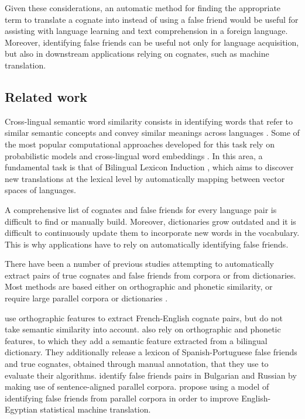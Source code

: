 \documentclass[output=paper]{langsci/langscibook}
\begin{document}
Given these considerations, an automatic method for finding the appropriate term to translate a cognate into instead of using a false friend would be useful for assisting with language learning and text comprehension in a foreign language.
Moreover, identifying false friends can be useful not only for language acquisition, but also in downstream applications relying on cognates, such as machine translation.

\subsection{Related work}

Cross-lingual semantic word similarity consists in identifying words that refer to similar semantic concepts and convey similar meanings across languages \citep{cognatesuban:vulic_and_moens_2}. Some of the most popular computational approaches developed for this task rely on probabilistic models \citep{cognatesuban:vulic_and_moens} and cross-lingual word embeddings \citep{cognatesuban:soegard_et_al}. In this area, a fundamental task is that of Bilingual Lexicon Induction \citep{cognatesuban:mikolov2013exploiting,cognatesuban:heyman2017bilingual,cognatesuban:vulic-moens-2015-bilingual}, which aims to discover new translations at the lexical level by automatically mapping between vector spaces of languages.

A comprehensive list of cognates and false friends for every language pair is difficult to find or manually build. Moreover, dictionaries grow outdated and it is difficult to continuously update them to incorporate new words in the vocabulary. This is why applications have to rely on automatically identifying false friends.

There have been a number of previous studies attempting to automatically extract pairs of true cognates and false friends from corpora or from dictionaries. Most methods are based either on orthographic and phonetic similarity, or require large parallel corpora or dictionaries \citep{cognatesuban:inkpen2005automatic,cognatesuban:st2017identifying,cognatesuban:nakov2009unsupervised,cognatesuban:chen2016false}. 

\citet{cognatesuban:inkpen2005automatic} use orthographic features to extract French-English cognate pairs, but do not take semantic similarity into account. \citet{cognatesuban:torres2011using} also rely on orthographic and phonetic features, to which they add a semantic feature extracted from a bilingual dictionary. They additionally release a lexicon of Spanish-Portuguese false friends and true cognates, obtained through manual annotation, that they use to evaluate their algorithms.
\citet{cognatesuban:nakov2009unsupervised} identify false friends pairs in Bulgarian and Russian by making use of sentence-aligned parallel corpora. \citet{cognatesuban:aminian-etal-2015-unsupervised} propose using a model of identifying false friends from parallel corpora in order to improve English-Egyptian statistical machine translation.
\end{document}
